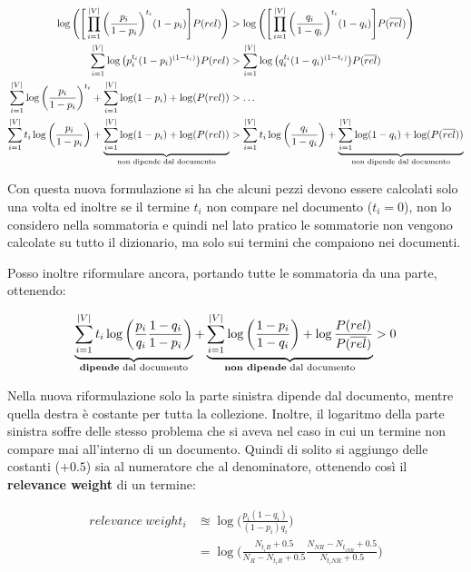 \begin{align*}
\log \Bigg(\Bigg[\prod\limits_{i=1}^{|V|} \bigg(\frac{ p_{i} }{1-p_i}\bigg)^{t_i} (1-p_i)\Bigg] P(rel)\Bigg) &>\log\Bigg(\Bigg[\prod\limits_{i=1}^{|V|} \bigg(\frac{ q_{i} }{1-q_i}\bigg)^{t_i} (1-q_i)\Bigg] P(\overline{rel})\Bigg) \\
\sum\limits_{i=1}^{|V|} \log\big( p_{i}^{t_i} (1 - p_{i})^{(1-t_i)} \big) P(rel) &> \sum\limits_{i=1}^{|V|} \log\big( q_{i}^{t_i} (1 - q_{i})^{(1-t_i)} \big) P(\overline{rel}) \\
\sum\limits_{i=1}^{|V|} \log\bigg( \frac{ p_{i} }{1-p_i} \bigg)^{t_i} +\sum\limits_{i=1}^{|V|} \log(1-p_i) + \log(P(rel)) &> \ldots \\
\sum\limits_{i=1}^{|V|} t_i \log\bigg( \frac{ p_{i} }{1-p_i} \bigg) + \underbrace{\sum\limits_{i=1}^{|V|} \log(1-p_i) + \log(P(rel))}_{\text{non dipende dal documento}} &> \sum\limits_{i=1}^{|V|} t_i \log\bigg( \frac{ q_{i} }{1-q_i} \bigg) +\underbrace{\sum\limits_{i=1}^{|V|} \log(1-q_i) + \log(P(\overline{rel}))}_{\text{non dipende dal documento}}
\end{align*}

\noindent Con questa nuova formulazione si ha che alcuni pezzi devono essere calcolati solo una volta ed inoltre se il termine $t_i$ non compare nel documento ($t_i=0$), non lo considero nella sommatoria e quindi nel lato pratico le sommatorie non vengono calcolate su tutto il dizionario, ma solo sui termini che compaiono nei documenti.

Posso inoltre riformulare ancora, portando tutte le sommatoria da una parte, ottenendo:

$$
\underbrace{\sum\limits_{i=1}^{|V|} t_i \log\bigg( \frac{p_i}{q_i} \frac{1-q_i}{1-p_i}\bigg)}_{\text{\textbf{dipende} dal documento}} + \underbrace{\sum\limits_{i=1}^{|V|} \log \bigg( \frac{1-p_i}{1-q_i} \bigg) + \log \frac{P(rel)}{P(\overline{rel})}}_{\text{\textbf{non dipende} dal documento}} > 0
$$

\noindent Nella nuova riformulazione solo la parte sinistra dipende dal documento, mentre quella destra è costante per tutta la collezione.
Inoltre, il logaritmo della parte sinistra soffre delle stesso problema che si aveva nel caso in cui un termine non compare mai all'interno di un documento.
Quindi di solito si aggiungo delle costanti ($+0.5$) sia al numeratore che al denominatore, ottenendo così il \textbf{relevance weight} di un termine:

\begin{align*}
	relevance \ weight_i  &\approxeq \log\bigg( \frac{p_i(1-q_i)}{(1-p_i)q_i} \bigg)	 \\
						  &= \log\bigg( \frac{N_{t_iR} + 0.5}{N_R - N_{t_iR} + 0.5} \frac{N_{NR} - N_{t_{iNR}}+ 0.5}{N_{t_iNR}+ 0.5} \bigg)		        
\end{align*}

